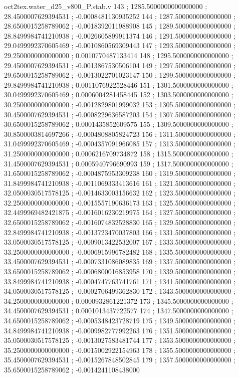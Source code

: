 \begin{filecontents}[overwrite]{oct2tex.water_d25_v800_P.stab.v}
143 ; 1285.5000000000000000 ; 28.4500007629394531 ; -0.0008481130935252
144 ; 1287.5000000000000000 ; 28.6500015258789062 ; -0.0018392011988908
145 ; 1289.5000000000000000 ; 28.8499984741210938 ; -0.0026605899911374
146 ; 1291.5000000000000000 ; 29.0499992370605469 ; -0.0010860569309443
147 ; 1293.5000000000000000 ; 29.2500000000000000 ; 0.0010770487133414
148 ; 1295.5000000000000000 ; 29.4500007629394531 ; -0.0013867530506104
149 ; 1297.5000000000000000 ; 29.6500015258789062 ; -0.0013022701023147
150 ; 1299.5000000000000000 ; 29.8499984741210938 ; 0.0011076922528446
151 ; 1301.5000000000000000 ; 30.0499992370605469 ; 0.0006004281458445
152 ; 1303.5000000000000000 ; 30.2500000000000000 ; -0.0012829801999032
153 ; 1305.5000000000000000 ; 30.4500007629394531 ; -0.0008229636587203
154 ; 1307.5000000000000000 ; 30.6500015258789062 ; 0.0001435852609575
155 ; 1309.5000000000000000 ; 30.8500003814697266 ; -0.0004808805824723
156 ; 1311.5000000000000000 ; 31.0499992370605469 ; -0.0004357091966085
157 ; 1313.5000000000000000 ; 31.2500000000000000 ; 0.0006216709734872
158 ; 1315.5000000000000000 ; 31.4500007629394531 ; 0.0005940796690993
159 ; 1317.5000000000000000 ; 31.6500015258789062 ; -0.0004875953309238
160 ; 1319.5000000000000000 ; 31.8499984741210938 ; -0.0011069333413616
161 ; 1321.5000000000000000 ; 32.0500030517578125 ; -0.0014633003156632
162 ; 1323.5000000000000000 ; 32.2500000000000000 ; -0.0015557190636173
163 ; 1325.5000000000000000 ; 32.4499969482421875 ; -0.0016016230219975
164 ; 1327.5000000000000000 ; 32.6500015258789062 ; -0.0016074832528830
165 ; 1329.5000000000000000 ; 32.8499984741210938 ; -0.0013723470037803
166 ; 1331.5000000000000000 ; 33.0500030517578125 ; -0.0009013422532007
167 ; 1333.5000000000000000 ; 33.2500000000000000 ; -0.0006915996782482
168 ; 1335.5000000000000000 ; 33.4500007629394531 ; -0.0007331086089835
169 ; 1337.5000000000000000 ; 33.6500015258789062 ; -0.0006800016853958
170 ; 1339.5000000000000000 ; 33.8499984741210938 ; -0.0004747763741761
171 ; 1341.5000000000000000 ; 34.0500030517578125 ; -0.0002706499362830
172 ; 1343.5000000000000000 ; 34.2500000000000000 ; 0.0000932861221372
173 ; 1345.5000000000000000 ; 34.4500007629394531 ; 0.0001013437722577
174 ; 1347.5000000000000000 ; 34.6500015258789062 ; -0.0005348423728719
175 ; 1349.5000000000000000 ; 34.8499984741210938 ; -0.0009982777992263
176 ; 1351.5000000000000000 ; 35.0500030517578125 ; -0.0013027583481744
177 ; 1353.5000000000000000 ; 35.2500000000000000 ; -0.0015002922154963
178 ; 1355.5000000000000000 ; 35.4500007629394531 ; -0.0015267848502845
179 ; 1357.5000000000000000 ; 35.6500015258789062 ; -0.0014241108438000

\end{filecontents}
